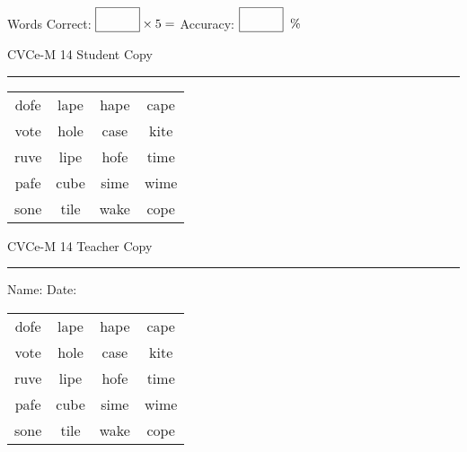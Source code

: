\documentclass{memoir}
\begin{document}
\small

Words Correct: $\fbox{\phantom{\huge 100}} \times 5 = $ Accuracy: $\fbox{\phantom{\huge 100}}\;\; \%$ 

\vfill

\newpage


\footnotesize \noindent
CVCe-M 14 \hfill Student Copy
\smallskip
\hrule

\Large

\setlength{\tabcolsep}{14pt}
\def\arraystretch{2}

{\selectfont


\begin{vplace}[0.5]
\begin{center}
\begin{tabular}{cccc}
dofe & lape & hape & cape \\
vote & hole & case & kite \\
ruve & lipe & hofe & time \\
pafe & cube & sime & wime \\
sone & tile & wake & cope \\
\end{tabular}
\end{center}
\end{vplace}

}

\newpage

\footnotesize \noindent
CVCe-M 14 \hfill Teacher Copy
\smallskip
\hrule

\small

\vfill

\noindent
Name: \underline{\hspace{1.75in}} \hfill Date: \underline{\hspace{1in}}

\Large

{\selectfont


\begin{vplace}[0.5]
\begin{center}
\begin{tabular}{cccc}
dofe & lape & hape & cape \\
vote & hole & case & kite \\
ruve & lipe & hofe & time \\
pafe & cube & sime & wime \\
sone & tile & wake & cope \\
\end{tabular}
\end{center}
\end{vplace}



}
\end{document}
